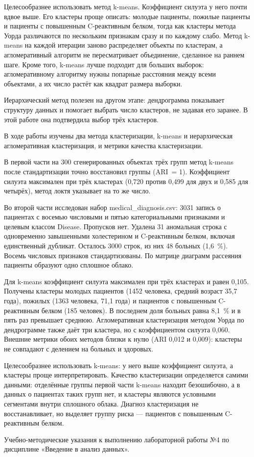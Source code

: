 \documentclass[a4paper,14pt]{extarticle}
\begin{document}
Целесообразнее использовать метод k-means. Коэффициент силуэта у него почти вдвое выше. Его кластеры проще описать: молодые пациенты, пожилые пациенты и пациенты с повышенным C-реактивным белком, тогда как кластеры метода Уорда различаются по нескольким признакам сразу и по каждому слабо. Метод k-means на каждой итерации заново распределяет объекты по кластерам, а агломеративный алгоритм не пересматривает объединение, сделанное на раннем шаге. Кроме того, k-means лучше подходит для больших выборок: агломеративному алгоритму нужны попарные расстояния между всеми объектами, а их число растёт как квадрат размера выборки.

Иерархический метод полезен на другом этапе: дендрограмма показывает структуру данных и помогает выбрать число кластеров, не задавая его заранее. В этой работе она подтвердила выбор трёх кластеров.

\suaiconclusion

В ходе работы изучены два метода кластеризации, k-means и иерархическая агломеративная кластеризация, и метрики качества кластеризации.

В первой части на 300 сгенерированных объектах трёх групп метод k-means после стандартизации точно восстановил группы (ARI~= 1). Коэффициент силуэта максимален при трёх кластерах (0,720 против 0,499 для двух и 0,585 для четырёх), метод локтя указывает на то же число.

Во второй части исследован набор medical\_diagnosis.csv: 3031 запись о пациентах с восемью числовыми и пятью категориальными признаками и целевым классом Disease. Пропусков нет. Удалена 31 аномальная строка с одновременно завышенными холестерином и C-реактивным белком, включая единственный дубликат. Осталось 3000 строк, из них 48 больных (1,6~\%). Восемь числовых признаков стандартизованы. По матрице диаграмм рассеяния пациенты образуют одно сплошное облако.

Для k-means коэффициент силуэта максимален при трёх кластерах и равен 0,105. Получены кластеры молодых пациентов (1452 человека, средний возраст 35,7 года), пожилых (1363 человека, 71,1 года) и пациентов с повышенным C-реактивным белком (185 человек). В последнем доля больных равна 8,1~\% и в пять раз превышает среднюю. Агломеративная кластеризация методом Уорда по дендрограмме также даёт три кластера, но с коэффициентом силуэта 0,060. Внешние метрики обоих методов близки к нулю (ARI 0,012 и 0,009): кластеры не совпадают с делением на больных и здоровых.

Целесообразнее использовать k-means: у него выше коэффициент силуэта, а кластеры проще интерпретировать. Качество кластеризации определяется самими данными: отделённые группы первой части k-means находит безошибочно, а в данных о пациентах таких групп нет, и кластеры являются условными сегментами внутри сплошного облака. Диагноз кластеризация не восстанавливает, но выделяет группу риска — пациентов с повышенным C-реактивным белком.

\suaisources
Учебно-методические указания к выполнению лабораторной работы №4 по дисциплине «Введение в анализ данных».
\end{document}
